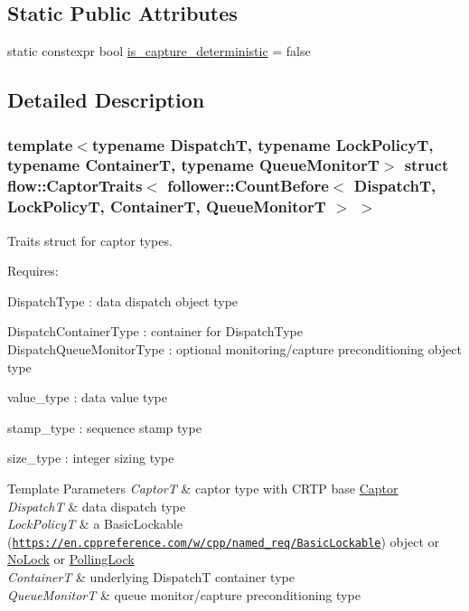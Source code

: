 \subsection*{Static Public Attributes}
\begin{DoxyCompactItemize}
\item 
static constexpr bool \hyperlink{structflow_1_1_captor_traits_3_01follower_1_1_count_before_3_01_dispatch_t_00_01_lock_policy_t_0d08c28482191f4a9fdac77c50d53921d_a1e7e3deda342f19b5c2df4c3a66f7af8}{is\+\_\+capture\+\_\+deterministic} = false
\end{DoxyCompactItemize}


\subsection{Detailed Description}
\subsubsection*{template$<$typename DispatchT, typename Lock\+PolicyT, typename ContainerT, typename Queue\+MonitorT$>$\newline
struct flow\+::\+Captor\+Traits$<$ follower\+::\+Count\+Before$<$ Dispatch\+T, Lock\+Policy\+T, Container\+T, Queue\+Monitor\+T $>$ $>$}

Traits struct for captor types. 

Requires\+:
\begin{DoxyItemize}
\item {\ttfamily Dispatch\+Type} \+: data dispatch object type
\item {\ttfamily Dispatch\+Container\+Type} \+: container for {\ttfamily Dispatch\+Type} {\ttfamily Dispatch\+Queue\+Monitor\+Type} \+: optional monitoring/capture preconditioning object type
\item {\ttfamily value\+\_\+type} \+: data value type
\item {\ttfamily stamp\+\_\+type} \+: sequence stamp type
\item {\ttfamily size\+\_\+type} \+: integer sizing type
\end{DoxyItemize}


\begin{DoxyTemplParams}{Template Parameters}
{\em CaptorT} & captor type with C\+R\+TP base {\ttfamily \hyperlink{classflow_1_1_captor}{Captor}}\\
\hline
{\em DispatchT} & data dispatch type \\
\hline
{\em Lock\+PolicyT} & a Basic\+Lockable (\href{https://en.cppreference.com/w/cpp/named_req/BasicLockable}{\tt https\+://en.\+cppreference.\+com/w/cpp/named\+\_\+req/\+Basic\+Lockable}) object or \hyperlink{structflow_1_1_no_lock}{No\+Lock} or \hyperlink{structflow_1_1_polling_lock}{Polling\+Lock} \\
\hline
{\em ContainerT} & underlying {\ttfamily DispatchT} container type \\
\hline
{\em Queue\+MonitorT} & queue monitor/capture preconditioning type \\
\hline
\end{DoxyTemplParams}


